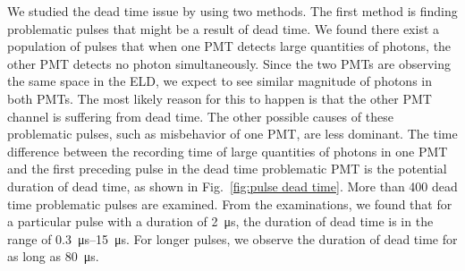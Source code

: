 We studied the dead time issue by using two methods. The first method is finding problematic pulses that might be a result of dead time. We found there exist a population of pulses that when one PMT detects large quantities of photons, the other PMT detects no photon simultaneously. Since the two PMTs are observing the same space in the ELD, we expect to see similar magnitude of photons in both PMTs. The most likely reason for this to happen is that the other PMT channel is suffering from dead time. The other possible causes of these problematic pulses, such as misbehavior of one PMT, are less dominant. The time difference between the recording time of large quantities of photons in one PMT and the first preceding pulse in the dead time problematic PMT is the potential duration of dead time, as shown in Fig.~\ref{fig:pulse dead time}. 
More than \num{400} dead time problematic pulses are examined. From the examinations, we found that for a particular pulse with a duration of \SI{2}{\us}, the duration of dead time is in the range of \SIrange{0.3}{15}{\us}. For longer pulses, we observe the duration of dead time for as long as \SI{80}{\us}.

